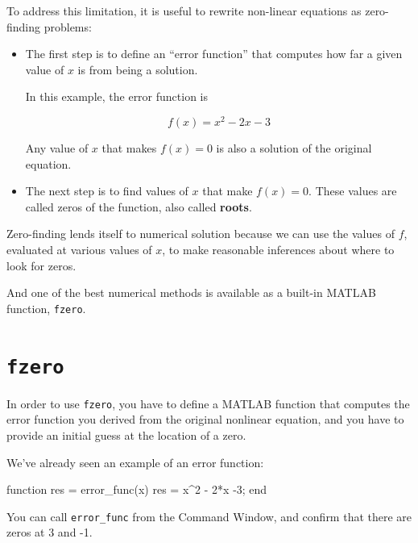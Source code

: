 \documentclass[
]{book}
\numberwithin{Answer}{chapter}
\numberwithin{Exercise}{chapter}
\begin{document}

To address this limitation, it is useful to
rewrite non-linear equations as zero-finding problems:

\begin{itemize}

\item The first step is to define an ``error function'' that computes how far
a given value of $x$ is from being a solution.

In this example, the error function is

\begin{equation}
f(x) = x^2 - 2x -3
\end{equation}

Any value of $x$ that makes $f(x) = 0$ is also a solution
of the original equation.


\item The next step is to find values of $x$ that make
$f(x) = 0$.  These values are called zeros of the
function, also called {\bf roots}.


\end{itemize}

Zero-finding lends itself to numerical solution because we can
use the values of $f$, evaluated at various values of $x$, to
make reasonable inferences about where to look for zeros.

And one of the best numerical methods is available as a built-in MATLAB function, {\tt fzero}.


\section{{\tt fzero}}
\label{sect:fzero}


In order to use {\tt fzero}, you have to define a MATLAB function
that computes the error function you derived from the original
nonlinear equation, and you have to provide an initial guess at
the location of a zero.

We've already seen an example of an error function:

\begin{code}
function res = error_func(x)
    res = x^2 - 2*x -3;
end
\end{code}

You can call {\tt error\_func} from the {\sf Command Window}, and
confirm that there are zeros at 3 and -1.
\end{document}
